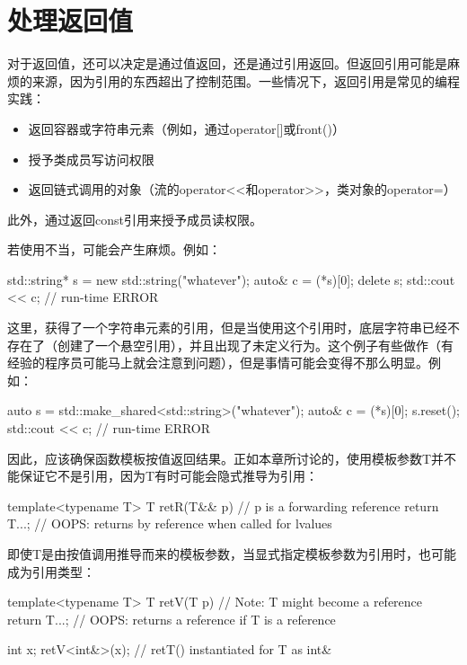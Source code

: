 \section{处理返回值}


对于返回值，还可以决定是通过值返回，还是通过引用返回。但返回引用可能是麻烦的来源，因为引用的东西超出了控制范围。一些情况下，返回引用是常见的编程实践：

\begin{itemize}
\item 
返回容器或字符串元素（例如，通过operator[]或front()）

\item 
授予类成员写访问权限

\item 
返回链式调用的对象（流的operator<{}<和operator>{}>，类对象的operator=）
\end{itemize}

此外，通过返回const引用来授予成员读权限。

若使用不当，可能会产生麻烦。例如：

\begin{cpp}
std::string* s = new std::string("whatever");
auto& c = (*s)[0];
delete s;
std::cout << c; // run-time ERROR
\end{cpp}

这里，获得了一个字符串元素的引用，但是当使用这个引用时，底层字符串已经不存在了（创建了一个悬空引用），并且出现了未定义行为。这个例子有些做作（有经验的程序员可能马上就会注意到问题），但是事情可能会变得不那么明显。例如：

\begin{cpp}
auto s = std::make_shared<std::string>("whatever");
auto& c = (*s)[0];
s.reset();
std::cout << c; // run-time ERROR
\end{cpp}

因此，应该确保函数模板按值返回结果。正如本章所讨论的，使用模板参数T并不能保证它不是引用，因为T有时可能会隐式推导为引用：

\begin{cpp}
template<typename T>
T retR(T&& p) { // p is a forwarding reference
	return T{...}; // OOPS: returns by reference when called for lvalues
}
\end{cpp}

即使T是由按值调用推导而来的模板参数，当显式指定模板参数为引用时，也可能成为引用类型：

\begin{cpp}
template<typename T>
T retV(T p) { // Note: T might become a reference
	return T{...}; // OOPS: returns a reference if T is a reference
}

int x;
retV<int&>(x); // retT() instantiated for T as int&
\end{cpp}


